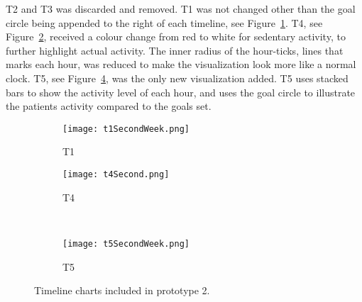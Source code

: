 T2 and T3 was discarded and removed. T1 was not changed other than the goal circle being appended to the right of each timeline, see Figure~\ref{fig:t1}. T4, see Figure~\ref{fig:t4}, received a colour change from red to white for sedentary activity, to further highlight actual activity. The inner radius of the hour-ticks, lines that marks each hour, was reduced to make the visualization look more like a normal clock. T5, see Figure~\ref{fig:t5}, was the only new visualization added. T5 uses stacked bars to show the activity level of each hour, and uses the goal circle to illustrate the patients activity compared to the goals set.

\begin{figure}[h!]
  \centering
  \begin{subfigure}[b]{0.6\textwidth}
    \centering
    \texttt{[image: t1SecondWeek.png]}
    \caption{T1}
    \label{fig:t1}
  \end{subfigure}
  \begin{subfigure}[b]{0.35\textwidth}
    \centering
    \texttt{[image: t4Second.png]}
    \caption{T4}
    \label{fig:t4}
  \end{subfigure}
  \\
  \begin{subfigure}[b]{0.95\textwidth}
    \centering
    \texttt{[image: t5SecondWeek.png]}
    \caption{T5}
    \label{fig:t5}
  \end{subfigure}
  \caption{Timeline charts included in prototype 2.}
\end{figure}
